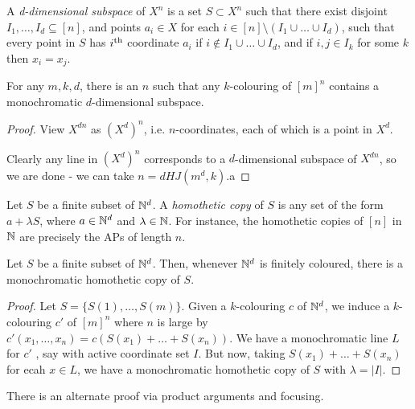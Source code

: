 \documentclass[10pt,a4paper]{article}
\begin{document}
A \emph{d-dimensional subspace} of $X^n$ is a set $S \subset X^n$ such that there exist disjoint $I_1, \ldots, I_d \subseteq [n]$, and points $a_i \in X$ for each $i \in [n]\setminus(I_1\cup\ldots\cup I_d)$, such that every point in $S$ has $i\textsuperscript{th}$ coordinate $a_i$ if $i \notin I_1\cup\ldots\cup I_d$, and if $i,j \in I_k$ for some $k$ then $x_i=x_j$.
\begin{theorem}
  For any $m,k,d$, there is an $n$ such that any $k$-colouring of $[m]^n$ contains a monochromatic $d$-dimensional subspace.
\end{theorem}
\begin{proof}
  View $X^{dn}$ as $(X^d)^n$, i.e. $n$-coordinates, each of which is a point in $X^d$.

  Clearly any line in $(X^d)^n$ corresponds to a $d$-dimensional subspace of $X^{dn}$, so we are done -  we can take $n=dHJ(m^d,k)$.a
\end{proof}
Let $S$ be a finite subset of $\mathbb{N}^d$. A \emph{homothetic copy} of $S$ is any set of the form $a+\lambda S$, where $a \in \mathbb{N}^d$ and $\lambda \in \mathbb{N}$. For instance, the homothetic copies of $[n]$ in $\mathbb{N}$ are precisely the APs of length $n$.
\begin{theorem}
  Let $S$ be a finite subset of $\mathbb{N}^d$. Then, whenever $\mathbb{N}^d$ is finitely coloured, there is a monochromatic homothetic copy of $S$.
\end{theorem}
\begin{proof}
  Let $S = \{S(1), \ldots, S(m)\}$. Given a $k$-colouring $c$ of $\mathbb{N}^d$, we induce a $k$-colouring $c'$ of $[m]^n$ where $n$ is large by $c'(x_1, \ldots, x_n) = c(S(x_1)+\ldots +S(x_n))$. We have a monochromatic line $L$ for $c'$ , say with active coordinate set $I$. But now, taking $S(x_1)+\ldots +S(x_n)$ for ecah $x \in L$, we have a monochromatic homothetic copy of $S$ with $\lambda = |I|$.
\end{proof}
There is an alternate proof via product arguments and focusing.
\end{document}
